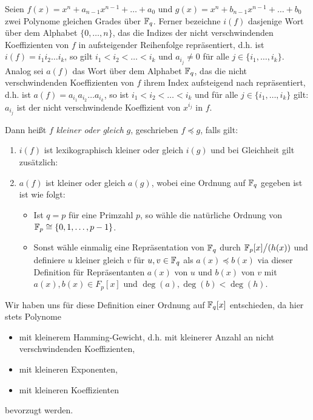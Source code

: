 \begin{definition}
  Seien $f(x) = x^n+a_{n-1}x^{n-1}+\ldots+a_0$ und
  $g(x) = x^n + b_{n-1}x^{n-1}+\ldots+b_0$ zwei Polynome gleichen Grades über 
  $\mathbb{F}_q$. Ferner bezeichne $i(f)$ dasjenige Wort über dem Alphabet
  $\{ 0,\ldots,n\}$, das die Indizes der nicht verschwindenden 
  Koeffizienten von $f$ in
  aufsteigender Reihenfolge repräsentiert, d.h. ist $i(f) = i_1i_2\ldots i_k$,
  so gilt $i_1<i_2<\ldots<i_k$ und $a_{i_j} \neq 0$ für alle 
  $j \in \{i_1,\ldots,i_k\}$. Analog sei $a(f)$ das Wort über dem Alphabet 
  $\mathbb{F}_q$, das die nicht verschwindenden Koeffizienten von $f$ 
  ihrem Index aufsteigend nach repräsentiert, d.h. ist 
  $a(f) = a_{i_1}a_{i_2}\ldots a_{i_k}$, so ist 
  $i_1<i_2<\ldots<i_k$ und für alle $j \in \{i_1,\ldots,i_k\}$ gilt:
  $a_{i_j}$ ist der nicht verschwindende Koeffizient
  von $x^{i_j}$ in $f$.

  Dann heißt $f$ \emph{kleiner oder gleich} $g$, 
  geschrieben $f\preceq g$, falls gilt:
  \begin{enumerate}
    \item $i(f)$ ist lexikographisch kleiner oder gleich $i(g)$ und bei
      Gleichheit gilt zusätzlich:
    \item $a(f)$ ist kleiner oder gleich $a(g)$, wobei eine Ordnung
      auf $\mathbb{F}_q$ gegeben ist ist wie folgt:
      \begin{itemize}
        \item Ist $q = p$ für eine Primzahl $p$, so wähle die natürliche Ordnung von
          $\mathbb{F}_p \cong \{ 0,1,\ldots,p-1\}$.
        \item Sonst wähle einmalig eine Repräsentation von 
          $\mathbb{F}_q$ durch $\mathbb{F}_p[x]\big/(h(x))$ und definiere 
          $u$ kleiner gleich $v$ für $u,v\in \mathbb{F}_q$ als
          $a(x) \preceq b(x)$ via dieser Definition für
          Repräsentanten $a(x)$ von $u$ und $b(x)$ von $v$ mit
          $a(x),b(x) \in F_p[x]$ und $\deg(a),\deg(b) < \deg(h)$.
      \end{itemize}
  \end{enumerate}
\end{definition}


Wir haben uns für diese Definition einer Ordnung auf $\mathbb{F}_q[x]$ entschieden, da
hier stets Polynome 
\begin{itemize}
  \item mit kleinerem Hamming-Gewicht, d.h. mit kleinerer Anzahl an 
    nicht verschwindenden Koeffizienten, 
  \item mit kleineren Exponenten,
  \item mit kleineren Koeffizienten
\end{itemize}
bevorzugt werden.



